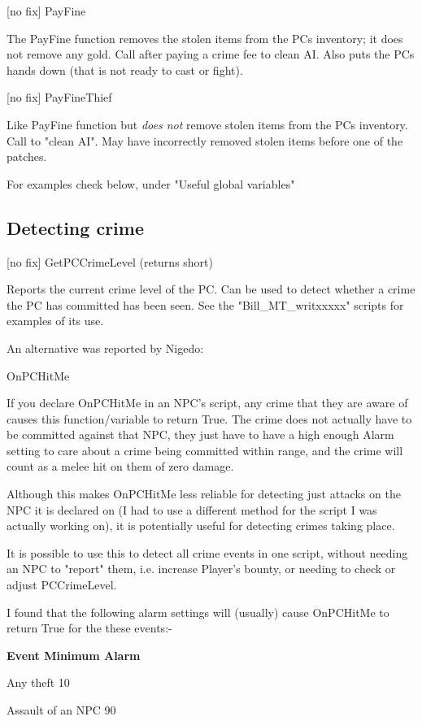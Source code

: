 \documentclass[
]{article}
\begin{document}
{[}no fix{]} PayFine

The PayFine function removes the stolen items from the PCs inventory; it
does not remove any gold. Call after paying a crime fee to clean AI.
Also puts the PCs hands down (that is not ready to cast or fight).

{[}no fix{]} PayFineThief

Like PayFine function but \emph{does not} remove stolen items from the
PCs inventory. Call to "clean AI". May have incorrectly removed stolen
items before one of the patches.

For examples check below, under "Useful global variables"

\hypertarget{detecting-crime}{%
\subsection{Detecting crime}\label{detecting-crime}}

{[}no fix{]} GetPCCrimeLevel (returns short)

Reports the current crime level of the PC. Can be used to detect whether
a crime the PC has committed has been seen. See the
"Bill\_MT\_writxxxxx" scripts for examples of its use.

An alternative was reported by Nigedo:

OnPCHitMe

If you declare OnPCHitMe in an NPC's script, any crime that they are
aware of causes this function/variable to return True. The crime does
not actually have to be committed against that NPC, they just have to
have a high enough Alarm setting to care about a crime being committed
within range, and the crime will count as a melee hit on them of zero
damage.

Although this makes OnPCHitMe less reliable for detecting just attacks
on the NPC it is declared on (I had to use a different method for the
script I was actually working on), it is potentially useful for
detecting crimes taking place.

It is possible to use this to detect all crime events in one script,
without needing an NPC to "report" them, i.e. increase Player's bounty,
or needing to check or adjust PCCrimeLevel.

I found that the following alarm settings will (usually) cause OnPCHitMe
to return True for the these events:-

\textbf{Event Minimum Alarm}

Any theft 10

Assault of an NPC 90
\end{document}
